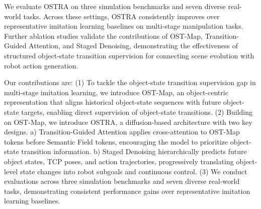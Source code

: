 We evaluate OSTRA on three simulation benchmarks and seven diverse real-world tasks.
Across these settings, OSTRA consistently improves over representative imitation learning baselines on multi-stage manipulation tasks.
Further ablation studies validate the contributions of OST-Map, Transition-Guided Attention, and Staged Denoising, demonstrating the effectiveness of structured object-state transition supervision for connecting scene evolution with robot action generation.

Our contributions are:
(1) To tackle the object-state transition supervision gap in multi-stage imitation learning, we introduce OST-Map, an object-centric representation that aligns historical object-state sequences with future object-state targets, enabling direct supervision of object-state transitions.
(2) Building on OST-Map, we introduce OSTRA, a diffusion-based architecture with two key designs.
    a) Transition-Guided Attention applies cross-attention to OST-Map tokens before Semantic Field tokens, encouraging the model to prioritize object-state transition information.
    b) Staged Denoising hierarchically predicts future object states, TCP poses, and action trajectories, progressively translating object-level state changes into robot subgoals and continuous control.
(3) We conduct evaluations across three simulation benchmarks and seven diverse real-world tasks, demonstrating consistent performance gains over representative imitation learning baselines.
